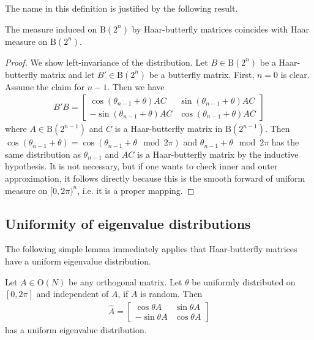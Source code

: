 The name in this definition is justified by the following result.

\begin{proposition}\label{p:hb}
The measure induced on $\mathrm B(2^n)$ by Haar-butterfly matrices coincides with Haar measure on $\mathrm B(2^n)$.
\end{proposition}

\begin{proof}
We show left-invariance of the distribution.  Let $B \in \mathrm B(2^n)$ be a Haar-butterfly matrix and let $B'\in \mathrm B(2^n)$ be a butterfly matrix. First, $n = 0$ is clear. Assume the claim for $n-1$.  Then we have 
\begin{align}
B' B = \begin{bmatrix} \cos ( \theta_{n-1} + \theta) AC & \sin ( \theta_{n-1} + \theta) AC \\ - \sin ( \theta_{n-1} + \theta) AC & \cos ( \theta_{n-1} + \theta) AC \end{bmatrix}
\end{align}
where $A \in \mathrm B(2^{n-1})$ and $C$ is a Haar-butterfly matrix in $\mathrm B(2^{n-1})$.  Then $\cos ( \theta_{n-1} + \theta) = \cos ( \theta_{n-1} + \theta \mod 2 \pi)$ and $\theta_{n-1} + \theta \mod 2 \pi$ has the same distribution as $\theta_{n-1}$ and $AC$ is a Haar-butterfly matrix by the inductive hypothesis.  It is not necessary, but if one wants to check inner and outer approximation, it follows directly because this is the smooth forward of uniform measure on $[0,2\pi)^n$, i.e. it is a proper mapping.
\end{proof}

\subsection{Uniformity of eigenvalue distributions} The following simple lemma immediately applies that Haar-butterfly matrices have a uniform eigenvalue distribution.

\begin{lemma}
Let $A \in \mathrm O(N)$ be any orthogonal matrix.  Let $\theta$ be uniformly distributed on $[0,2\pi]$ and independent of $A$, if  $A$ is random.  Then
\begin{align}
\hat A = \begin{bmatrix} \cos \theta A & \sin \theta A \\ - \sin \theta A & \cos \theta A \end{bmatrix}
\end{align}
has a uniform eigenvalue distribution.
\end{lemma}

